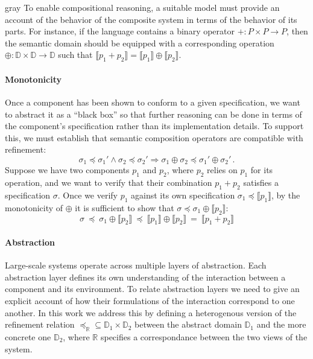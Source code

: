 \documentclass[acmsmall,authordraft]{acmart}
\newcommand{\refby}{\preceq}
\begin{document}
\begin{color}{gray}
To enable compositional reasoning,
a suitable model must provide an account of
the behavior of the composite system
in terms of the behavior of its parts.
For instance,
if the language contains a binary operator
${+} : P \times P \rightarrow P$,
then the semantic domain should be equipped with
a corresponding operation
${\oplus} : \mathbb{D} \times \mathbb{D} \rightarrow \mathbb{D}$
such that
$\llbracket p_1 + p_2 \rrbracket =
 \llbracket p_1 \rrbracket \oplus \llbracket p_2 \rrbracket$.


\paragraph{Monotonicity} %

Once a component has been shown to conform to a given specification,
we want to abstract it as a ``black box''
so that further reasoning can be done in terms of
the component's specification rather than its implementation details.
To support this,
we must establish that semantic composition operators
are compatible with refinement:
\[ \sigma_1 \refby \sigma_1' \wedge
   \sigma_2 \refby \sigma_2' \Rightarrow
   \sigma_1 \oplus \sigma_2 \refby \sigma_1' \oplus \sigma_2' \,. \]
Suppose we have two components $p_1$ and $p_2$,
where $p_2$ relies on $p_1$ for its operation,
and we want to verify that their combination $p_1 + p_2$
satisfies a specification $\sigma$.
Once we verify $p_1$ against its own specification
$\sigma_1 \refby \llbracket p_1 \rrbracket$,
by the monotonicity of ${\oplus}$ it is sufficient to show that
$\sigma \refby \sigma_1 \oplus \llbracket p_2 \rrbracket$:
\[
   \sigma \:\refby\:
   \sigma_1 \oplus \llbracket p_2 \rrbracket \:\refby\:
   \llbracket p_1 \rrbracket \oplus \llbracket p_2 \rrbracket \:=\:
   \llbracket p_1 + p_2 \rrbracket
\]


\paragraph{Abstraction} %

Large-scale systems operate across multiple layers of abstraction.
Each abstraction layer defines its own understanding of the interaction
between a component and its environment.
To relate abstraction layers we need to give
an explicit account of how their formulations of the interaction
correspond to one another.
In this work we address this by defining a heterogenous version
of the refinement relation
${\refby_\mathbb{R}} \subseteq
 \mathbb{D}_1 \times \mathbb{D}_2$ between
the abstract domain $\mathbb{D}_1$ and
the more concrete one $\mathbb{D}_2$, where
$\mathbb{R}$ specifies a correspondance between
the two views of the system.


\end{color}
\end{document}
